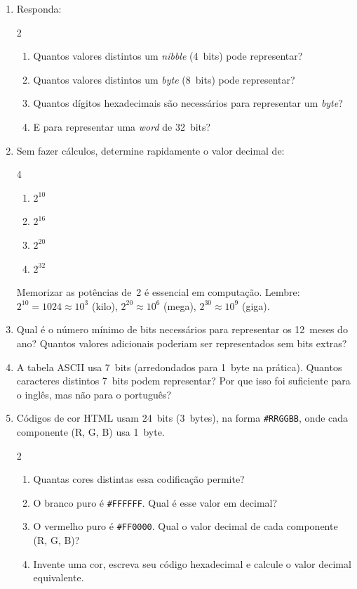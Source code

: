 \documentclass[11pt, a4paper]{article}
\begin{document}
\begin{enumerate}
\item Responda:
\begin{multicols}{2}
\begin{enumerate}
  \item Quantos valores distintos um \emph{nibble} (4~bits) pode representar?
  \item Quantos valores distintos um \emph{byte} (8~bits) pode representar?
  \item Quantos d\'{i}gitos hexadecimais s\~{a}o necess\'{a}rios para representar um \emph{byte}?
  \item E para representar uma \emph{word} de 32~bits?
\end{enumerate}
\end{multicols}

\item Sem fazer c\'{a}lculos, determine rapidamente o valor decimal de:
\begin{multicols}{4}
\begin{enumerate}
  \item $2^{10}$
  \item $2^{16}$
  \item $2^{20}$
  \item $2^{32}$
\end{enumerate}
\end{multicols}
\vspace{-4pt}
\begin{dica}
Memorizar as pot\^{e}ncias de~2 \'{e} essencial em computa\c{c}\~{a}o. Lembre: $2^{10} = 1024 \approx 10^3$ (kilo), $2^{20} \approx 10^6$ (mega), $2^{30} \approx 10^9$ (giga).
\end{dica}
\item Qual \'{e} o n\'{u}mero m\'{i}nimo de bits necess\'{a}rios para representar os 12~meses do ano? Quantos valores adicionais poderiam ser representados sem bits extras?

\item A tabela ASCII usa 7~bits (arredondados para 1~byte na pr\'{a}tica). Quantos caracteres distintos 7~bits podem representar? Por que isso foi suficiente para o ingl\^{e}s, mas n\~{a}o para o portugu\^{e}s?

\item C\'{o}digos de cor HTML usam 24~bits (3~bytes), na forma \texttt{\#RRGGBB}, onde cada componente (R, G, B) usa 1~byte.
\begin{multicols}{2}
\begin{enumerate}
  \item Quantas cores distintas essa codifica\c{c}\~{a}o permite?
  \item O branco puro \'{e} \texttt{\#FFFFFF}. Qual \'{e} esse valor em decimal?
  \item O vermelho puro \'{e} \texttt{\#FF0000}. Qual o valor decimal de cada componente (R, G, B)?
  \item Invente uma cor, escreva seu c\'{o}digo hexadecimal e calcule o valor decimal equivalente.
\end{enumerate}
\end{multicols}


\end{enumerate}
\end{document}
